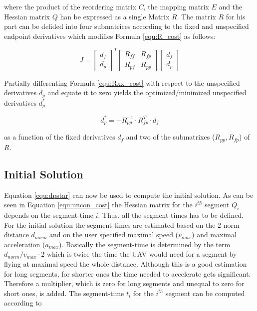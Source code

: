 where the product of the reordering matrix $C$, the mapping matrix $E$ and the Hessian matrix $Q$ han be expressed as a single Matrix $R$. The matrix $R$ for his part can be defided into four submatrices according to the fixed and unspecified endpoint derivatives which modifies Formula \ref{equ:R_cost} as follows:

\begin{equation}
J =
\begin{bmatrix}
   d_f \\
  d_p
\end{bmatrix}^T
\begin{bmatrix}
   R_{ff} & R_{fp} \\
  R_{pf} & R_{pp}
\end{bmatrix}
\begin{bmatrix}
   d_f \\
  d_p
\end{bmatrix}
\label{equ:Rxx_cost}
\end{equation}

Partially differenting Formula \ref{equ:Rxx_cost} with respect to the unspecified derivatives $d_p$ and equate it to zero yields the optimized/minimized unspecified derivatives $d_p^*$ 

\begin{equation}
d_p^* = - R_{pp}^{-1} \cdot R_{fp}^T \cdot d_f
\label{equ:dpstar}
\end{equation}

as a function of the fixed derivatives $d_f$ and two of the submatrixes ($R_{pp}, R_{fp}$) of $R$.


\subsection{Initial Solution}\label{sec:initialSolution}

Equation \ref{equ:dpstar} can now be used to compute the initial solution. As can be seen in Equation \ref{equ:uncon_cost} the Hessian matrix for the  $ i^{th}$ segment $Q_i$ depends on the segment-time $i$. Thus, all the segment-times has to be defined. For the initial solution the segment-times are estimated based on the 2-norm distance $d_{norm}$ and on the user specified maximal speed ($v_{max}$) and maximal acceleration ($a_{max}$). \newline
Basically the segment-time is determined by the term $d_{norm}/v_{max} \cdot 2$ which is twice the time the UAV would need for a segment by flying at maximal speed the whole distance. Although this is a good estimation for long segments, for shorter ones the time needed to accelerate gets significant. Therefore a multiplier, which is zero for long segments and unequal to zero for short ones, is added. The segment-time $t_i$ for the $i^{th}$ segment can be computed according to 

